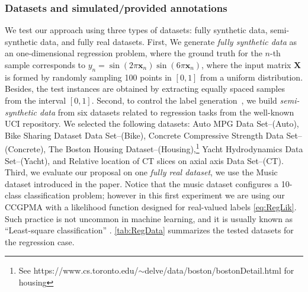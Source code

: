 \documentclass[9pt]{article}
\providecommand{\ve}[1]{{\bm{#1}}}%
\providecommand{\mat}[1]{{\bm{#1}}} %
\providecommand{\ve}[1]{{\mathbf{#1}}}
\providecommand{\mat}[1]{{\mathbf{#1}}}
\begin{document}
\subsubsection{Datasets and simulated/provided annotations}\label{sec:datasetsReg}
We test our approach using three types of datasets: fully synthetic data, semi-synthetic data, and fully real datasets. First, We generate \textit{fully synthetic data} as an one-dimensional regression problem, where the ground truth for the $n$-th sample corresponds to $y_n = \sin(2\pi \ve{x}_n)\sin(6\pi \ve{x}_n)$, where the input matrix $\mat{X}$ is formed by randomly sampling 100 points in $[0,1]$ from a uniform distribution. Besides, the test instances are obtained by extracting equally spaced samples from the interval $[0,1]$. Second, to control the label generation~\cite{ruiz2019learning}, we build \textit{semi-synthetic data} from six datasets related to regression tasks from the well-known {UCI repository}. We selected the following datasets: {Auto MPG Data Set}--(Auto), {Bike Sharing Dataset Data Set}--(Bike), {Concrete Compressive Strength Data Set}--(Concrete), {The Boston Housing Dataset}--(Housing),\footnote{See https://www.cs.toronto.edu/$\sim${d}elve/data/boston/bostonDetail.html for housing} {Yacht Hydrodynamics Data Set}--(Yacht), and {Relative location of CT slices on axial axis Data Set}--(CT).  
Third, we evaluate our proposal on one \textit{fully real dataset}, we use the Music dataset introduced in the paper. Notice that the music dataset configures a 10-class classification problem; however in this first experiment we are using our CCGPMA with a likelihood function designed for real-valued labels \cref{eq:RegLik}. Such practice is not uncommon in machine learning, and it is usually known as ``Least-square classification'' \cite{rasmussen2006gaussian}. \cref{tab:RegData} summarizes the tested datasets for the regression case.
\begin{table}[!tb]
	\caption{Datasets for regression.
	}
	\label{tab:RegData}
	\centering
\end{table}
\end{document}
